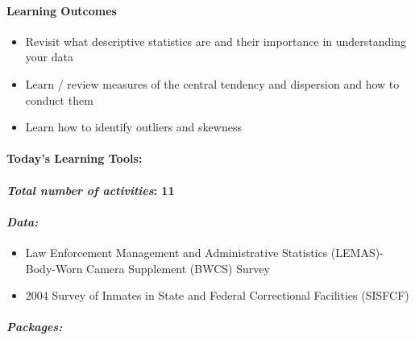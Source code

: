 \documentclass[
]{book}
\providecommand{\tightlist}{%
  \setlength{\itemsep}{0pt}\setlength{\parskip}{0pt}}
\begin{document}
\hypertarget{learning-outcomes-3}{%
\paragraph*{\texorpdfstring{\textbf{Learning Outcomes}}{Learning Outcomes}}\label{learning-outcomes-3}}

\begin{itemize}
\tightlist
\item
  Revisit what descriptive statistics are and their importance in understanding your data
\item
  Learn / review measures of the central tendency and dispersion and how to conduct them
\item
  Learn how to identify outliers and skewness
\end{itemize}

\hypertarget{todays-learning-tools-3}{%
\paragraph*{\texorpdfstring{\textbf{Today's Learning Tools:}}{Today's Learning Tools:}}\label{todays-learning-tools-3}}

\hypertarget{total-number-of-activities-11}{%
\paragraph*{\texorpdfstring{\emph{Total number of activities}: 11}{Total number of activities: 11}}\label{total-number-of-activities-11}}

\hypertarget{data-3}{%
\paragraph*{\texorpdfstring{\emph{Data:}}{Data:}}\label{data-3}}

\begin{itemize}
\tightlist
\item
  Law Enforcement Management and Administrative Statistics (LEMAS)-Body-Worn Camera Supplement (BWCS) Survey
\item
  2004 Survey of Inmates in State and Federal Correctional Facilities (SISFCF)
\end{itemize}

\hypertarget{packages-4}{%
\paragraph*{\texorpdfstring{\emph{Packages:}}{Packages:}}\label{packages-4}}
\end{document}
